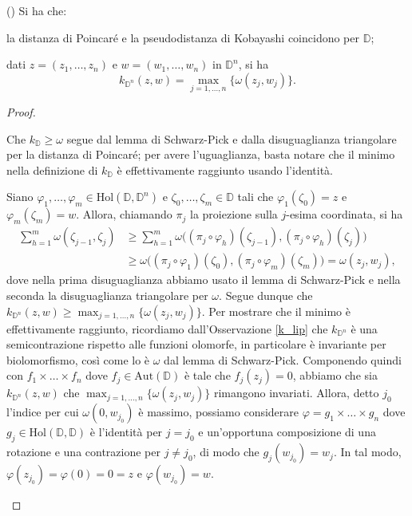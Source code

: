 \begin{prop}
    (\cite[Chapter 2.3, Proposition 2.3.4 and Corollary 2.3.7]{A1}) Si ha che:
    \begin{nlist}
        \item la distanza di Poincaré e la pseudodistanza di Kobayashi coincidono per $\mathbb{D}$;
        \item dati $z=(z_1,\dots,z_n)$ e $w=(w_1,\dots,w_n)$ in $\mathbb{D}^n$, si ha
        $$k_{\mathbb{D}^n}(z,w)=\max_{j=1,\dots,n}\{\omega(z_j,w_j)\}.$$
    \end{nlist}
\end{prop}
\begin{proof}
    \begin{nlist}
        \item Che $k_{\mathbb{D}}\ge\omega$ segue dal lemma di Schwarz-Pick e dalla disuguaglianza triangolare per la distanza di Poincaré; per avere l'uguaglianza, basta notare che il minimo nella definizione di $k_{\mathbb{D}}$ è effettivamente raggiunto usando l'identità.
        \item Siano $\varphi_1,\dots,\varphi_m \in \text{Hol}(\mathbb{D},\mathbb{D}^n)$ e $\zeta_0,\dots,\zeta_m \in \mathbb{D}$ tali che $\varphi_1(\zeta_0)=z$ e $\varphi_m(\zeta_m)=w$. Allora, chiamando $\pi_j$ la proiezione sulla $j$-esima coordinata, si ha
        \begin{align*}
            \sum_{h=1}^m \omega(\zeta_{j-1},\zeta_j) &\ge \sum_{h=1}^m \omega\big((\pi_j\circ \varphi_h)(\zeta_{j-1}),(\pi_j\circ \varphi_h)(\zeta_j)\big)\\
            & \ge \omega\big((\pi_j\circ \varphi_1)(\zeta_0),(\pi_j\circ \varphi_m)(\zeta_m)\big)=\omega(z_j,w_j),
        \end{align*}
        dove nella prima disuguaglianza abbiamo usato il lemma di Schwarz-Pick e nella seconda la disuguaglianza triangolare per $\omega$. Segue dunque che $k_{\mathbb{D}^n}(z,w)\ge\max_{j=1,\dots,n}\{\omega(z_j,w_j)\}$.
        Per mostrare che il minimo è effettivamente raggiunto, ricordiamo dall'Osservazione \ref{k_lip} che $k_{\mathbb{D}^n}$ è una semicontrazione rispetto alle funzioni olomorfe, in particolare è invariante per biolomorfismo, così come lo è $\omega$ dal lemma di Schwarz-Pick. Componendo quindi con $f_1\times\dots\times f_n$ dove $f_j \in \text{Aut}(\mathbb{D})$ è tale che $f_j(z_j)=0$, abbiamo che sia $k_{\mathbb{D}^n}(z,w)$ che $\max_{j=1,\dots,n}\{\omega(z_j,w_j)\}$ rimangono invariati. Allora, detto $j_0$ l'indice per cui $\omega(0,w_{j_0})$ è massimo, possiamo considerare $\varphi=g_1\times\dots\times g_n$ dove $g_j \in\text{Hol}(\mathbb{D},\mathbb{D})$ è l'identità per $j=j_0$ e un'opportuna composizione di una rotazione e una contrazione per $j\not=j_0$, di modo che $g_j(w_{j_0})=w_j$. In tal modo, $\varphi(z_{j_0})=\varphi(0)=0=z$ e $\varphi(w_{j_0})=w$.
    \end{nlist}
\end{proof}

